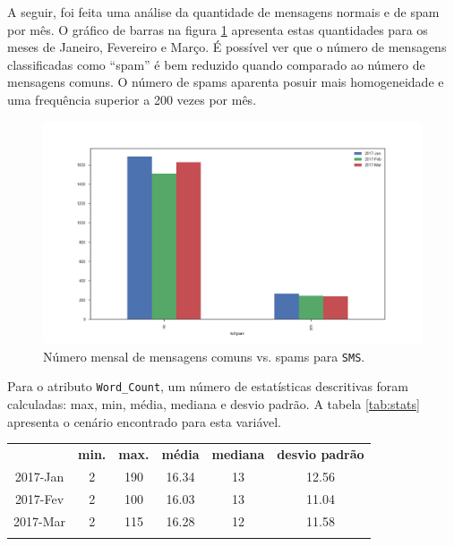 \documentclass[a4paper,11pt]{article}
\begin{document}
\newpage
A seguir, foi feita uma análise da quantidade de mensagens normais e de spam por mês. O 
gráfico de barras na figura \ref{fig:monthly_spam} apresenta estas quantidades para os meses de Janeiro, Fevereiro 
e Março. É possível ver que o número de mensagens classificadas como ``spam'' é bem reduzido 
quando comparado ao número de mensagens comuns. O número de spams aparenta posuir mais 
homogeneidade e uma frequência superior a 200 vezes por mês.


\begin{figure}[htbp]
    \centering
    \includegraphics[width=\textwidth]{monthly_spam.png}
    \caption[Figura simples]{Número mensal de mensagens comuns vs. spams para \texttt{SMS}.}
    \label{fig:monthly_spam}
\end{figure}


Para o atributo \texttt{Word\_Count}, um número de estatísticas descritivas foram calculadas: 
max, min, média, mediana e desvio padrão. A tabela \ref{tab:stats} apresenta o cenário encontrado para
esta variável.



\vspace{.5cm}
{}
\begin{center}
\begin{tabular}{cccccc}
 \hline
            &  \textbf{min.} &  \textbf{max.}  &  \textbf{média}  & \textbf{mediana}  & \textbf{desvio padrão}\\
  2017-Jan  &  2    &  190  &  16.34  &  13  &  12.56 \\
  2017-Fev  &  2    &  100  &  16.03  &  13  &  11.04  \\
  2017-Mar  &  2    &  115  &  16.28  &  12  &  11.58  \\
 \hline
 \label{tab:stats}
\end{tabular}
\end{center}
\end{document}
